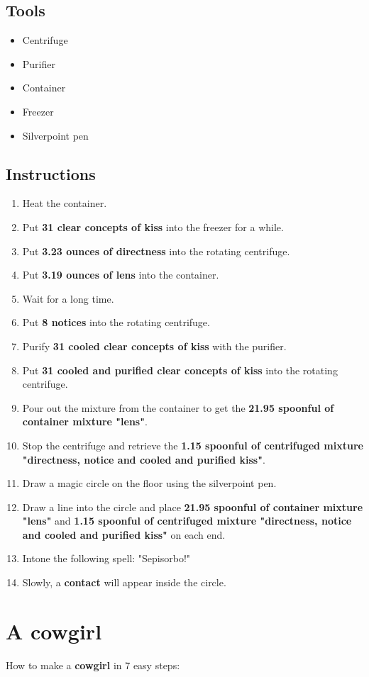 \documentclass{article}
\begin{document}
\subsection{Tools}\begin{itemize}
\item 
Centrifuge
\item 
Purifier
\item 
Container
\item 
Freezer
\item 
Silverpoint pen
\end{itemize}
\subsection{Instructions}\begin{enumerate}
\item 
Heat the container.
\item 
Put \textbf{31 clear concepts of kiss} into the freezer for a while.
\item 
Put \textbf{3.23 ounces of directness} into the rotating centrifuge.
\item 
Put \textbf{3.19 ounces of lens} into the container.
\item 
Wait for a long time.
\item 
Put \textbf{8 notices} into the rotating centrifuge.
\item 
Purify \textbf{31 cooled clear concepts of kiss} with the purifier.
\item 
Put \textbf{31 cooled and purified clear concepts of kiss} into the rotating centrifuge.
\item 
Pour out the mixture from the container to get the \textbf{21.95 spoonful of container mixture "lens"}.
\item 
Stop the centrifuge and retrieve the \textbf{1.15 spoonful of centrifuged mixture "directness, notice and cooled and purified kiss"}.
\item 
Draw a magic circle on the floor using the silverpoint pen.
\item 
Draw a line into the circle and place \textbf{21.95 spoonful of container mixture "lens"} and \textbf{1.15 spoonful of centrifuged mixture "directness, notice and cooled and purified kiss"} on each end.
\item 
Intone the following spell: "Sepisorbo!"
\item 
Slowly, a \textbf{contact} will appear inside the circle.
\end{enumerate}
\newpage
\section{A cowgirl}How to make a \textbf{cowgirl} in 7 easy steps:
\end{document}
